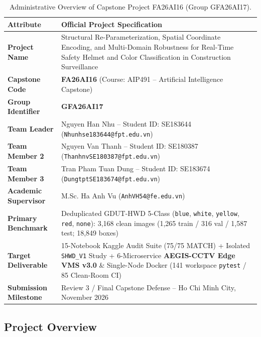 \begin{table}[htbp]
\centering
\caption{Administrative Overview of Capstone Project FA26AI16 (Group GFA26AI17).}
\label{tab:ch1_project_info}
\small
\renewcommand{\arraystretch}{1.15}
\begin{tabularx}{\textwidth}{|>{\bfseries}p{4.2cm}|X|}
\hline
\rowcolor{slatehdr}
Attribute & Official Project Specification \\
\hline
Project Name & Structural Re-Parameterization, Spatial Coordinate Encoding, and Multi-Domain Robustness for Real-Time Safety Helmet and Color Classification in Construction Surveillance \\
\hline
Capstone Code & \textbf{FA26AI16} (Course: AIP491 -- Artificial Intelligence Capstone) \\
\hline
Group Identifier & \textbf{GFA26AI17} \\
\hline
Team Leader & Nguyen Han Nhu -- Student ID: SE183644 (\texttt{Nhunhse183644@fpt.edu.vn}) \\
\hline
Team Member 2 & Nguyen Van Thanh -- Student ID: SE180387 (\texttt{ThanhnvSE180387@fpt.edu.vn}) \\
\hline
Team Member 3 & Tran Pham Tuan Dung -- Student ID: SE183674 (\texttt{DungtptSE183674@fpt.edu.vn}) \\
\hline
Academic Supervisor & M.Sc. Ha Anh Vu (\texttt{AnhVH54@fe.edu.vn}) \\
\hline
Primary Benchmark & Deduplicated GDUT-HWD 5-Class (\texttt{blue}, \texttt{white}, \texttt{yellow}, \texttt{red}, \texttt{none}): 3,168 clean images (1,265 train / 316 val / 1,587 test; 18,849 boxes) \\
\hline
Target Deliverable & 15-Notebook Kaggle Audit Suite (75/75 MATCH) + Isolated \texttt{SHWD\_V1} Study + 6-Microservice \textbf{AEGIS-CCTV Edge VMS v3.0} \& Single-Node Docker (141 workspace \texttt{pytest} / 85 Clean-Room CI) \\
\hline
Submission Milestone & Review 3 / Final Capstone Defense -- Ho Chi Minh City, November 2026 \\
\hline
\end{tabularx}
\end{table}

\subsection{Project Overview}

